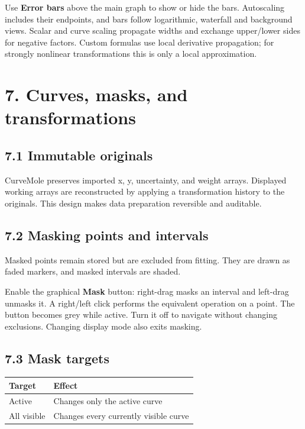 \documentclass[
  10pt,
  a4paper,
  oneside]{scrreprt}
\begin{document}
Use \textbf{Error bars} above the main graph to show or hide the bars.
Autoscaling includes their endpoints, and bars follow logarithmic,
waterfall and background views. Scalar and curve scaling propagate
widths and exchange upper/lower sides for negative factors. Custom
formulas use local derivative propagation; for strongly nonlinear
transformations this is only a local approximation.

\hypertarget{curves-masks-and-transformations}{%
\chapter{7. Curves, masks, and
transformations}\label{curves-masks-and-transformations}}

\hypertarget{immutable-originals}{%
\section{7.1 Immutable originals}\label{immutable-originals}}

CurveMole preserves imported x, y, uncertainty, and weight arrays.
Displayed working arrays are reconstructed by applying a transformation
history to the originals. This design makes data preparation reversible
and auditable.

\hypertarget{masking-points-and-intervals}{%
\section{7.2 Masking points and
intervals}\label{masking-points-and-intervals}}

Masked points remain stored but are excluded from fitting. They are
drawn as faded markers, and masked intervals are shaded.

Enable the graphical \textbf{Mask} button: right-drag masks an interval
and left-drag unmasks it. A right/left click performs the equivalent
operation on a point. The button becomes grey while active. Turn it off
to navigate without changing exclusions. Changing display mode also
exits masking.

\hypertarget{mask-targets}{%
\section{7.3 Mask targets}\label{mask-targets}}

\begin{longtable}[]{@{}ll@{}}
\toprule
Target & Effect\tabularnewline
\midrule
\endhead
Active & Changes only the active curve\tabularnewline
All visible & Changes every currently visible curve\tabularnewline
\bottomrule
\end{longtable}
\end{document}
